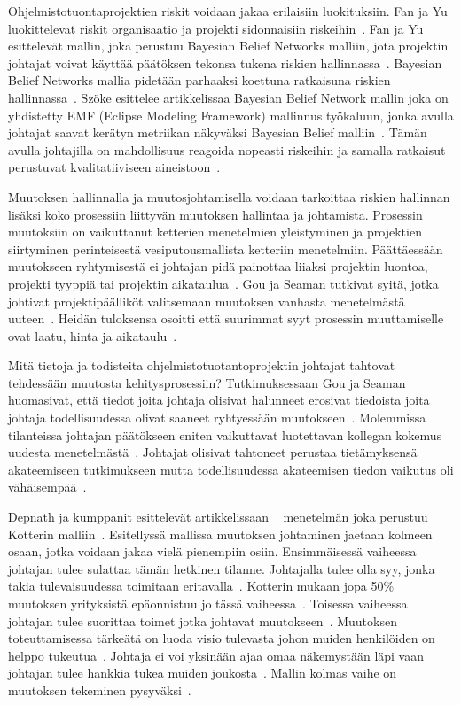 \documentclass[finnish]{tktltiki2}
\theoremstyle{definition}
\theoremstyle{remark}
\begin{document}
Ohjelmistotuontaprojektien riskit voidaan jakaa erilaisiin luokituksiin. Fan ja Yu luokittelevat riskit organisaatio ja projekti sidonnaisiin riskeihin~\cite{fan2004bbn}. Fan ja Yu esittelevät mallin, joka perustuu Bayesian Belief Networks malliin, jota projektin johtajat voivat käyttää päätöksen tekonsa tukena riskien hallinnassa~\cite{fan2004bbn}. Bayesian Belief Networks mallia pidetään parhaaksi koettuna ratkaisuna riskien hallinnassa~\cite{szHokeproject}. Szöke esittelee artikkelissaa Bayesian Belief Network mallin joka on yhdistetty EMF (Eclipse Modeling Framework) mallinnus työkaluun, jonka avulla johtajat saavat kerätyn metriikan näkyväksi Bayesian Belief malliin~\cite{szHokeproject}. Tämän avulla johtajilla on mahdollisuus reagoida nopeasti riskeihin ja samalla ratkaisut perustuvat kvalitatiiviseen aineistoon~\cite{szHokeproject}.

Muutoksen hallinnalla ja muutosjohtamisella voidaan tarkoittaa riskien hallinnan lisäksi koko prosessiin liittyvän muutoksen hallintaa ja johtamista. Prosessin muutoksiin on vaikuttanut ketterien menetelmien yleistyminen ja projektien siirtyminen perinteisestä vesiputousmallista ketteriin menetelmiin. Päättäessään muutokseen ryhtymisestä ei johtajan pidä painottaa liiaksi projektin luontoa, projekti tyyppiä tai projektin aikataulua~\cite{Chow2008961}. Gou ja Seaman tutkivat syitä, jotka johtivat projektipäälliköt valitsemaan muutoksen vanhasta menetelmästä uuteen~\cite{Guo:2008:SSP:1414004.1414046}. Heidän tuloksensa osoitti että suurimmat syyt prosessin muuttamiselle ovat laatu, hinta ja aikataulu~\cite{Guo:2008:SSP:1414004.1414046}.

Mitä tietoja ja todisteita ohjelmistotuotantoprojektin johtajat tahtovat tehdessään muutosta kehitysprosessiin? Tutkimuksessaan Gou ja Seaman huomasivat, että tiedot joita johtaja olisivat halunneet erosivat tiedoista joita johtaja todellisuudessa olivat saaneet ryhtyessään muutokseen~\cite{Guo:2008:SSP:1414004.1414046}. Molemmissa tilanteissa johtajan päätökseen eniten vaikuttavat luotettavan kollegan kokemus uudesta menetelmästä~\cite{Guo:2008:SSP:1414004.1414046}. Johtajat olisivat tahtoneet perustaa tietämyksensä akateemiseen tutkimukseen mutta todellisuudessa akateemisen tiedon vaikutus oli vähäisempää~\cite{Guo:2008:SSP:1414004.1414046}.

Depnath ja kumppanit esittelevät artikkelissaan ~\cite{4017705} menetelmän joka perustuu Kotterin malliin~\cite{kotter1995leading}. Esitellyssä mallissa muutoksen johtaminen jaetaan kolmeen osaan, jotka voidaan jakaa vielä pienempiin osiin. Ensimmäisessä vaiheessa johtajan tulee sulattaa tämän hetkinen tilanne. Johtajalla tulee olla syy, jonka takia tulevaisuudessa toimitaan eritavalla~\cite{4017705}. Kotterin mukaan jopa 50\% muutoksen yrityksistä epäonnistuu jo tässä vaiheessa~\cite{kotter1995leading}. Toisessa vaiheessa johtajan tulee suorittaa toimet jotka johtavat muutokseen~\cite{4017705}. Muutoksen toteuttamisessa tärkeätä on luoda visio tulevasta johon muiden henkilöiden on helppo tukeutua~\cite{4017705}. Johtaja ei voi yksinään ajaa omaa näkemystään läpi vaan johtajan tulee hankkia tukea muiden joukosta~\cite{4017705}. Mallin kolmas vaihe on muutoksen tekeminen pysyväksi~\cite{4017705}.
\end{document}

